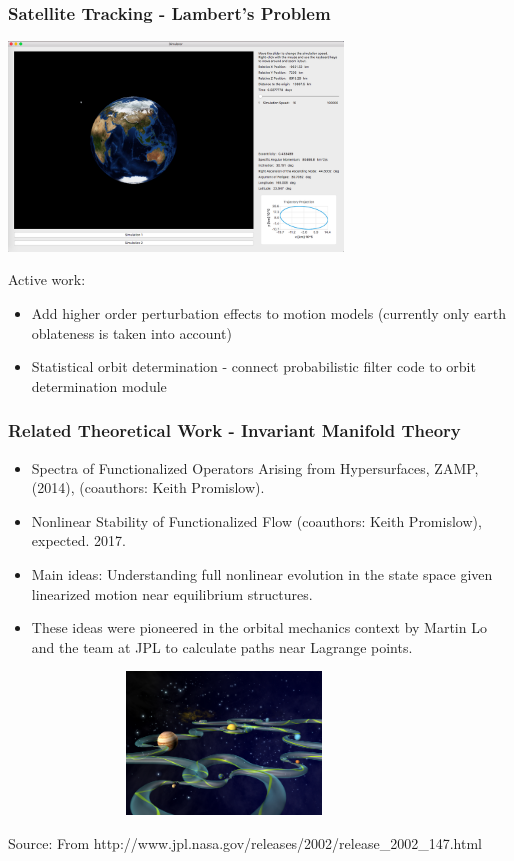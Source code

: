 \documentclass[mathserif]{beamer}
\begin{document}
\begin{frame}
\frametitle{Satellite Tracking - Lambert's Problem}

\includegraphics[width=3.5in]{sat3.png}

Active work: 

\begin{itemize}
\item Add higher order perturbation effects to motion models (currently only earth oblateness is taken into account)
\item Statistical orbit determination - connect probabilistic filter code to orbit determination module
\end{itemize}

\end{frame}

\begin{frame}
\frametitle{Related Theoretical Work - Invariant Manifold Theory}

\begin{itemize}
\item Spectra of Functionalized Operators Arising from Hypersurfaces, ZAMP, (2014),
(coauthors: Keith Promislow).

\item Nonlinear Stability of Functionalized Flow  (coauthors: Keith Promislow), expected. 2017.

\item Main ideas:  Understanding full nonlinear evolution in the state space given linearized motion near equilibrium structures.

\item These ideas were pioneered in the orbital mechanics context by Martin Lo and the team at JPL to calculate paths near Lagrange points.
\end{itemize}

\includegraphics[height=1.5in, width=4.5in]{ish.jpg}

\tiny{Source: From http://www.jpl.nasa.gov/releases/2002/release\_2002\_147.html}

\end{frame}
\end{document}
